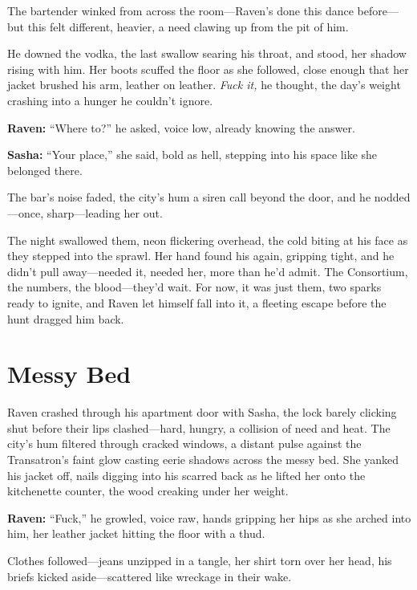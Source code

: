 \documentclass[12pt]{book}
\begin{document}
The bartender winked from across the room—Raven’s done this dance before—but this felt different, heavier, a need clawing up from the pit of him.

He downed the vodka, the last swallow searing his throat, and stood, her shadow rising with him. Her boots scuffed the floor as she followed, close enough that her jacket brushed his arm, leather on leather. \textit{Fuck it,} he thought, the day’s weight crashing into a hunger he couldn’t ignore.

\vspace{0.5em}
\textbf{Raven:} “Where to?” he asked, voice low, already knowing the answer.

\vspace{0.5em}
\textbf{Sasha:} “Your place,” she said, bold as hell, stepping into his space like she belonged there.

The bar’s noise faded, the city’s hum a siren call beyond the door, and he nodded—once, sharp—leading her out.

The night swallowed them, neon flickering overhead, the cold biting at his face as they stepped into the sprawl. Her hand found his again, gripping tight, and he didn’t pull away—needed it, needed her, more than he’d admit. The Consortium, the numbers, the blood—they’d wait. For now, it was just them, two sparks ready to ignite, and Raven let himself fall into it, a fleeting escape before the hunt dragged him back.

\section{Messy Bed}

Raven crashed through his apartment door with Sasha, the lock barely clicking shut before their lips clashed—hard, hungry, a collision of need and heat. The city’s hum filtered through cracked windows, a distant pulse against the Transatron’s faint glow casting eerie shadows across the messy bed. She yanked his jacket off, nails digging into his scarred back as he lifted her onto the kitchenette counter, the wood creaking under her weight.

\vspace{0.5em}
\textbf{Raven:} “Fuck,” he growled, voice raw, hands gripping her hips as she arched into him, her leather jacket hitting the floor with a thud.

Clothes followed—jeans unzipped in a tangle, her shirt torn over her head, his briefs kicked aside—scattered like wreckage in their wake.
\end{document}

